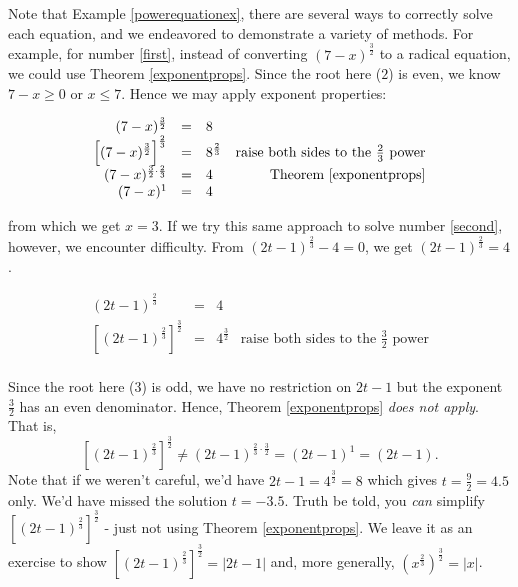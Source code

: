 \documentclass{ximera}
\begin{document}
Note that Example \ref{powerequationex}, there are several ways to correctly solve each equation, and we endeavored to demonstrate a variety of methods.  For example, for number \ref{first}, instead of converting $(7-x)^{\frac{3}{2}}$ to a radical equation, we could use Theorem \ref{exponentprops}.  Since the root here ($2$) is even, we know $7-x \geq 0$ or $x \leq 7$.  Hence we may apply exponent properties: 

\[ \begin{array}{rclr}  

(7-x)^{\frac{3}{2}} & = & 8 & \\

 \left[(7-x)^{\frac{3}{2}}\right]^{\frac{2}{3}} & = & 8^{\frac{2}{3}} & \text{raise both sides to the $\frac{2}{3}$ power} \\
 
 (7-x)^{\frac{3}{2} \cdot \frac{2}{3}} & = & 4 & \text{Theorem \ref{exponentprops}} \\
 
(7-x)^{1} & = & 4 \\ \end{array} \]

from which we get $x = 3$.  If we try this same approach to solve number \ref{second}, however, we encounter difficulty.  From $(2t-1)^{\frac{2}{3}} -4 = 0$, we get $(2t-1)^{\frac{2}{3}}  =4$.  

\[ \begin{array}{rclr}  

(2t-1)^{\frac{2}{3}} & = & 4 & \\

 \left[(2t-1)^{\frac{2}{3}}  \right]^{\frac{3}{2}} & = & 4^{\frac{3}{2}}& \text{raise both sides to the $\frac{3}{2}$ power} \\ \end{array} \]
 
 Since the root here ($3$) is odd, we have no restriction on $2t-1$ but the exponent $\frac{3}{2}$ has an even denominator.  Hence, Theorem \ref{exponentprops} \textit{does not apply}.  That is, \[\left[(2t-1)^{\frac{2}{3}}  \right]^{\frac{3}{2}} \neq (2t-1)^{\frac{2}{3} \cdot \frac{3}{2}} = (2t-1)^{1} = (2t-1).\]
 Note that if we weren't careful, we'd have $2t-1 = 4^{\frac{3}{2}} = 8$ which gives $t= \frac{9}{2} = 4.5$ only.   We'd have missed the solution $t = -3.5$.  Truth be told, you \textit{can} simplify $\left[(2t-1)^{\frac{2}{3}}  \right]^{\frac{3}{2}} $ - just not using Theorem \ref{exponentprops}.  We leave it as an exercise to show  $\left[(2t-1)^{\frac{2}{3}}  \right]^{\frac{3}{2}} = |2t-1|$ and, more generally, $\left(x^{\frac{2}{3}}\right)^{\frac{3}{2}} = |x|$.
 
\end{document}

